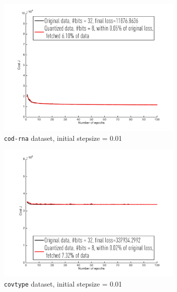 \documentclass{article}
\begin{document}
\begin{figure}[h]
\centering
    \begin{subfigure}[b]{.3\columnwidth}
    \includegraphics[width=\columnwidth]{svm/cod-rna/001}
    \caption{\texttt{cod-rna} dataset, initial stepsize = 0.01}
    \end{subfigure}
    \begin{subfigure}[b]{.3\columnwidth}
    \includegraphics[width=\columnwidth]{svm/cov-type/001}
    \caption{\texttt{covtype} dataset, initial stepsize = 0.01}
    \end{subfigure}
    \begin{subfigure}[b]{.3\columnwidth}

\end{subfigure}
\end{figure}
\end{document}

